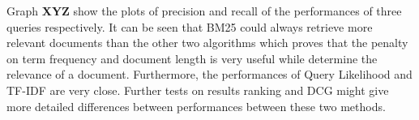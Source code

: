 \begin{table}
  \caption{Results for all our ranking algorithms for three different queries.}
  \label{fig:results}


\end{table}


Graph \textbf{XYZ } show the plots of precision and recall of the performances of three queries respectively. It can be seen that BM25 could always retrieve more relevant documents than the other two algorithms which proves that the penalty  on term frequency and document length is very useful while determine the relevance of a document. Furthermore, the performances of Query Likelihood and TF-IDF are very close. Further tests on results ranking and DCG might give more detailed differences between performances between these two methods.

